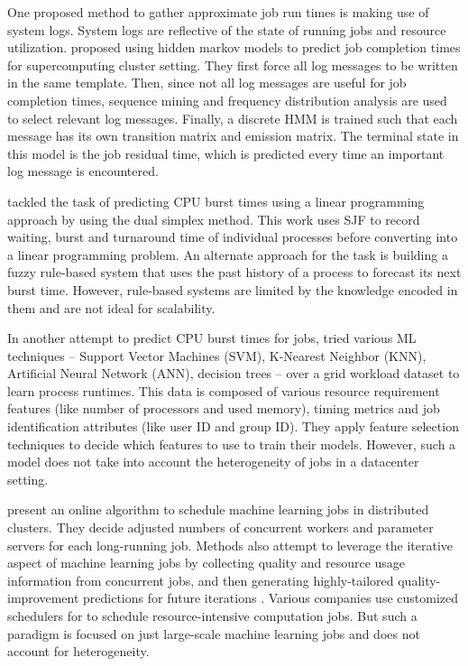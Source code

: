 \documentclass{hotnets19}
\begin{document}
One proposed method to gather approximate job run times is making use of system logs. System logs are reflective of the state of running jobs and resource utilization.
\cite{predictjobcompletion} proposed using hidden markov models to predict job completion times for supercomputing cluster setting.
They first force all log messages to be written in the same template.
Then, since not all log messages are useful for job completion times, sequence mining and frequency distribution analysis are used to select relevant log messages.
Finally, a discrete HMM is trained such that each message has its own transition matrix and emission matrix.
The terminal state in this model is the job residual time, which is predicted every time an important log message is encountered.

\cite{dualsimplex} tackled the task of predicting CPU burst times using a linear programming approach by using the dual simplex method.
This work uses SJF to record waiting, burst and turnaround time of individual processes before converting into a linear programming problem.
An alternate approach for the task is building a fuzzy rule-based system that uses the past history of a process to forecast its next burst time.
However, rule-based systems are limited by the knowledge encoded in them and are not ideal for scalability.

In another attempt to predict CPU burst times for jobs, \cite{helmy2015machine}  tried various ML techniques -- Support Vector Machines (SVM), K-Nearest Neighbor (KNN), Artificial Neural Network (ANN), decision trees -- over a grid workload dataset to learn process runtimes.
This data is composed of various resource requirement features (like number of processors and used memory), timing metrics and job identification attributes (like user ID and group ID).
They apply feature selection techniques to decide which features to use to train their models.
However, such a model does not take into account the heterogeneity of jobs in a datacenter setting.

\cite{onlinescheduling} present an online algorithm to schedule machine learning jobs in distributed clusters.
They decide adjusted numbers of concurrent workers and parameter servers for each long-running job.
Methods also attempt to leverage the iterative aspect of machine learning jobs by collecting quality and resource usage information from concurrent jobs, and then generating highly-tailored quality-improvement predictions for future iterations \cite{slaq}.
Various companies use customized schedulers for to schedule resource-intensive computation jobs.
But such a paradigm is focused on just large-scale machine learning jobs and does not account for heterogeneity.
\end{document}
